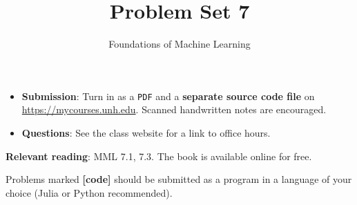 \documentclass[letterpaper]{article}
\title{Problem Set 7}
\author{Foundations of Machine Learning}
\date{}
\begin{document}
\maketitle

\begin{itemize}
\item \textbf{Submission}: Turn in as a \texttt{PDF} and a \textbf{separate source code file} on \url{https://mycourses.unh.edu}. Scanned handwritten notes are encouraged.
\item \textbf{Questions}: See the class website for a link to office hours.
\end{itemize}

\textbf{Relevant reading}: MML 7.1, 7.3. The book is available online for free.

Problems marked \textbf{[code]} should be submitted as a program in a language of your choice (Julia or Python recommended).
\end{document}
